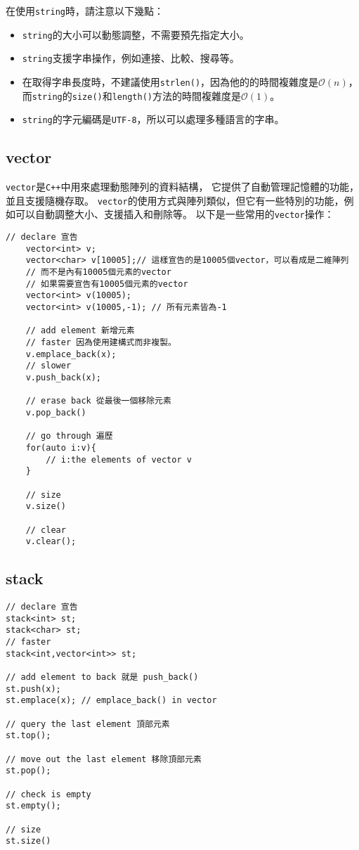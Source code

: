     在使用\texttt{string}時，請注意以下幾點：
    \begin{itemize}
        \item \texttt{string}的大小可以動態調整，不需要預先指定大小。
        \item \texttt{string}支援字串操作，例如連接、比較、搜尋等。
        \item 在取得字串長度時，不建議使用\texttt{strlen()}，因為他的的時間複雜度是\(\mathcal{O}(n)\)，
        而\texttt{string}的\texttt{size()}和\texttt{length()}方法的時間複雜度是\(\mathcal{O}(1)\)。
        \item \texttt{string}的字元編碼是\texttt{UTF-8}，所以可以處理多種語言的字串。
    \end{itemize}
    \subsection{vector}

    \texttt{vector}是\texttt{C++}中用來處理動態陣列的資料結構，
    它提供了自動管理記憶體的功能，並且支援隨機存取。
    \texttt{vector}的使用方式與陣列類似，但它有一些特別的功能，例如可以自動調整大小、支援插入和刪除等。
    \newpage
    以下是一些常用的\texttt{vector}操作：
    \begin{lstlisting}[caption=vector 用法]
    // declare 宣告
    vector<int> v;
    vector<char> v[10005];// 這樣宣告的是10005個vector，可以看成是二維陣列
    // 而不是內有10005個元素的vector
    // 如果需要宣告有10005個元素的vector
    vector<int> v(10005);
    vector<int> v(10005,-1); // 所有元素皆為-1

    // add element 新增元素
    // faster 因為使用建構式而非複製。
    v.emplace_back(x);
    // slower
    v.push_back(x);

    // erase back 從最後一個移除元素
    v.pop_back()

    // go through 遍歷
    for(auto i:v){
        // i:the elements of vector v
    }

    // size
    v.size()
        
    // clear
    v.clear();
    \end{lstlisting}

    \subsection{stack}

\begin{lstlisting}[caption=stack 用法]
// declare 宣告
stack<int> st;
stack<char> st;
// faster
stack<int,vector<int>> st;

// add element to back 就是 push_back()
st.push(x);
st.emplace(x); // emplace_back() in vector

// query the last element 頂部元素
st.top();

// move out the last element 移除頂部元素
st.pop();

// check is empty
st.empty();

// size
st.size()
\end{lstlisting}

